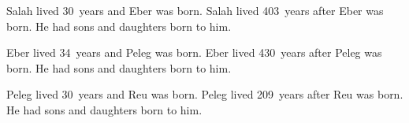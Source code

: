 \begin{inparaenum}
     Salah lived 30~years and Eber was born.%
     Salah lived 403~years after Eber was born. He had sons and daughters born to him.%
    
     Eber lived 34~years and Peleg was born.%
     Eber lived 430~years after Peleg was born. He had sons and daughters born to him.%
    
     Peleg lived 30~years and Reu was born.%
     Peleg lived 209~years after Reu was born. He had sons and daughters born to him.%
    
    
    
    
    
\end{inparaenum}
